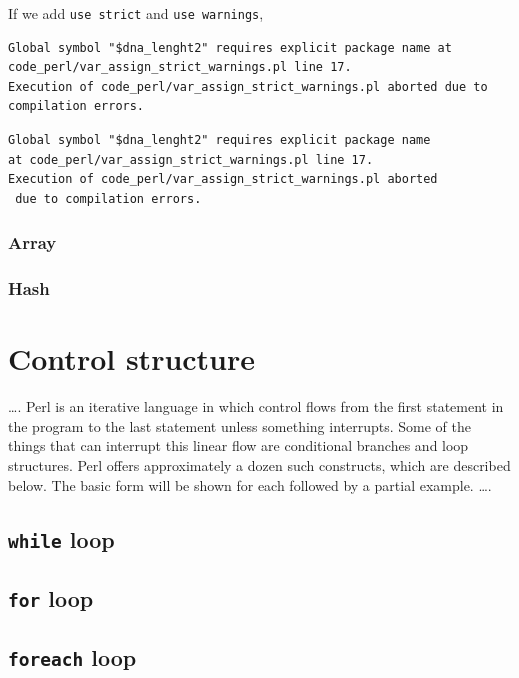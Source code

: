 \documentclass[]{book}
\theoremstyle{definition}
\theoremstyle{definition}
\theoremstyle{definition}
\theoremstyle{remark}
\begin{document}
If we add \texttt{use\ strict} and \texttt{use\ warnings},

\begin{verbatim}
Global symbol "$dna_lenght2" requires explicit package name at code_perl/var_assign_strict_warnings.pl line 17.
Execution of code_perl/var_assign_strict_warnings.pl aborted due to compilation errors.
\end{verbatim}

\begin{verbatim}
Global symbol "$dna_lenght2" requires explicit package name 
at code_perl/var_assign_strict_warnings.pl line 17.
Execution of code_perl/var_assign_strict_warnings.pl aborted
 due to compilation errors.
\end{verbatim}

\subsection{Array}\label{array}

\subsection{Hash}\label{hash}

\chapter{Control structure}\label{control-structure}

\ldots{}. Perl is an iterative language in which control flows from the
first statement in the program to the last statement unless something
interrupts. Some of the things that can interrupt this linear flow are
conditional branches and loop structures. Perl offers approximately a
dozen such constructs, which are described below. The basic form will be
shown for each followed by a partial example. \ldots{}.

\section{\texorpdfstring{\texttt{while}
loop}{while loop}}\label{while-loop}

\section{\texorpdfstring{\texttt{for} loop}{for loop}}\label{for-loop}

\section{\texorpdfstring{\texttt{foreach}
loop}{foreach loop}}\label{foreach-loop}
\end{document}
